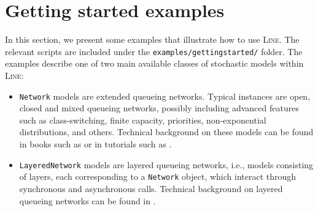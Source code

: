 \section{Getting started examples}
In this section, we present some examples that illustrate how to use \textsc{Line}. The relevant scripts are included under the \texttt{examples/gettingstarted/} folder. The examples describe one of two main available classes of stochastic models within \textsc{Line}:
\begin{itemize}
\item \texttt{Network} models are extended queueing networks. Typical instances are open, closed and mixed queueing networks, possibly including advanced features such as class-switching, finite capacity,
    priorities, non-exponential distributions, and others. Technical background on
    these models can be found in books such as \cite{BolGMT06,LazZGS84} or in tutorials such as \cite{Lav89,Bal00}.
\item \texttt{LayeredNetwork} models are layered queueing networks, i.e., models consisting of layers, each corresponding
    to a \texttt{Network} object, which interact through synchronous and asynchronous calls. Technical background on
    layered queueing networks can be found in \cite{lqntut}.
\end{itemize}

